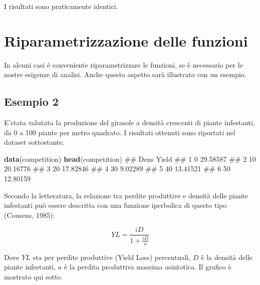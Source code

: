 \documentclass[a4paper,12pt,oneside]{book}
\newenvironment{Shaded}{\begin{snugshade}}{\end{snugshade}}
\newcommand{\KeywordTok}[1]{\textcolor[rgb]{0.13,0.29,0.53}{\textbf{#1}}}
\newcommand{\NormalTok}[1]{#1}
\theoremstyle{definition}
\theoremstyle{definition}
\theoremstyle{definition}
\theoremstyle{remark}
\begin{document}
I risultati sono praticamente identici.

\section{Riparametrizzazione delle
funzioni}\label{riparametrizzazione-delle-funzioni}

In alcuni casi è conveniente riparametrizzare le funzioni, se è
necessario per le nostre esigenze di analisi. Anche questo aspetto sarà
illustrato con un esempio.

\subsection{Esempio 2}\label{esempio-2}

E'stata valutata la produzione del girasole a densità crescenti di
piante infestanti, da 0 a 100 piante per metro quadrato. I risultati
ottenuti sono riportati nel dataset sottostante.

\begin{Shaded}
\begin{Highlighting}[]
\KeywordTok{data}\NormalTok{(competition)}
\KeywordTok{head}\NormalTok{(competition)}
\NormalTok{##   Dens    Yield}
\NormalTok{## 1    0 29.58587}
\NormalTok{## 2   10 20.16776}
\NormalTok{## 3   20 17.82846}
\NormalTok{## 4   30  9.02289}
\NormalTok{## 5   40 13.41521}
\NormalTok{## 6   50 12.80159}
\end{Highlighting}
\end{Shaded}

Secondo la letteratura, la relazione tra perdite produttive e densità
delle piante infestanti può essere descritta con una funzione iperbolica
di questo tipo (Cousens, 1985):

\[YL = \frac{iD}{1 + \frac{iD}{a}}\]

Dove \(YL\) sta per perdite produttive (Yield Loss) percentuali, \(D\) è
la densità delle piante infestanti, \(a\) è la perdita produttiva
massima asintotica. Il grafico è mostrato qui sotto.
\end{document}

